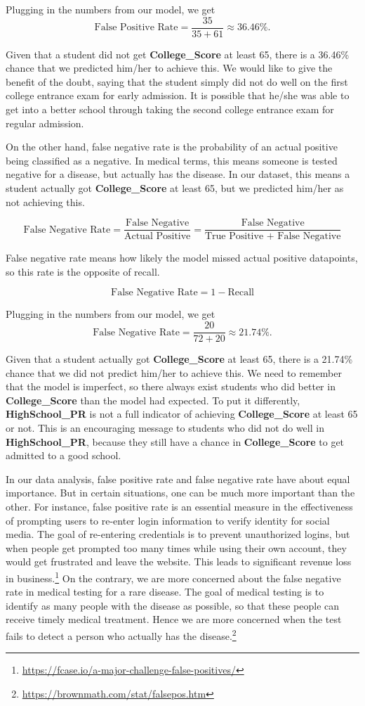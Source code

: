 \documentclass[
]{article}
\begin{document}
Plugging in the numbers from our model, we get
\[\text{False Positive Rate} = \dfrac{35}{35+61} \approx 36.46\%.\]

Given that a student did not get \textbf{College\_Score} at least 65,
there is a 36.46\% chance that we predicted him/her to achieve this. We
would like to give the benefit of the doubt, saying that the student
simply did not do well on the first college entrance exam for early
admission. It is possible that he/she was able to get into a better
school through taking the second college entrance exam for regular
admission.

On the other hand, false negative rate is the probability of an actual
positive being classified as a negative. In medical terms, this means
someone is tested negative for a disease, but actually has the disease.
In our dataset, this means a student actually got
\textbf{College\_Score} at least 65, but we predicted him/her as not
achieving this.

\[\text{False Negative Rate} = \dfrac{\text{False Negative}}{\text{Actual Positive}} = \dfrac{\text{False Negative}}{\text{True Positive + False Negative}}\]

False negative rate means how likely the model missed actual positive
datapoints, so this rate is the opposite of recall.

\[\text{False Negative Rate} = 1 - \text{Recall}\]

Plugging in the numbers from our model, we get
\[\text{False Negative Rate} = \dfrac{20}{72+20} \approx 21.74\%.\]

Given that a student actually got \textbf{College\_Score} at least 65,
there is a 21.74\% chance that we did not predict him/her to achieve
this. We need to remember that the model is imperfect, so there always
exist students who did better in \textbf{College\_Score} than the model
had expected. To put it differently, \textbf{HighSchool\_PR} is not a
full indicator of achieving \textbf{College\_Score} at least 65 or not.
This is an encouraging message to students who did not do well in
\textbf{HighSchool\_PR}, because they still have a chance in
\textbf{College\_Score} to get admitted to a good school.

In our data analysis, false positive rate and false negative rate have
about equal importance. But in certain situations, one can be much more
important than the other. For instance, false positive rate is an
essential measure in the effectiveness of prompting users to re-enter
login information to verify identity for social media. The goal of
re-entering credentials is to prevent unauthorized logins, but when
people get prompted too many times while using their own account, they
would get frustrated and leave the website. This leads to significant
revenue loss in business.\footnote{\url{https://fcase.io/a-major-challenge-false-positives/}}
On the contrary, we are more concerned about the false negative rate in
medical testing for a rare disease. The goal of medical testing is to
identify as many people with the disease as possible, so that these
people can receive timely medical treatment. Hence we are more concerned
when the test fails to detect a person who actually has the
disease.\footnote{\url{https://brownmath.com/stat/falsepos.htm}}
\end{document}
